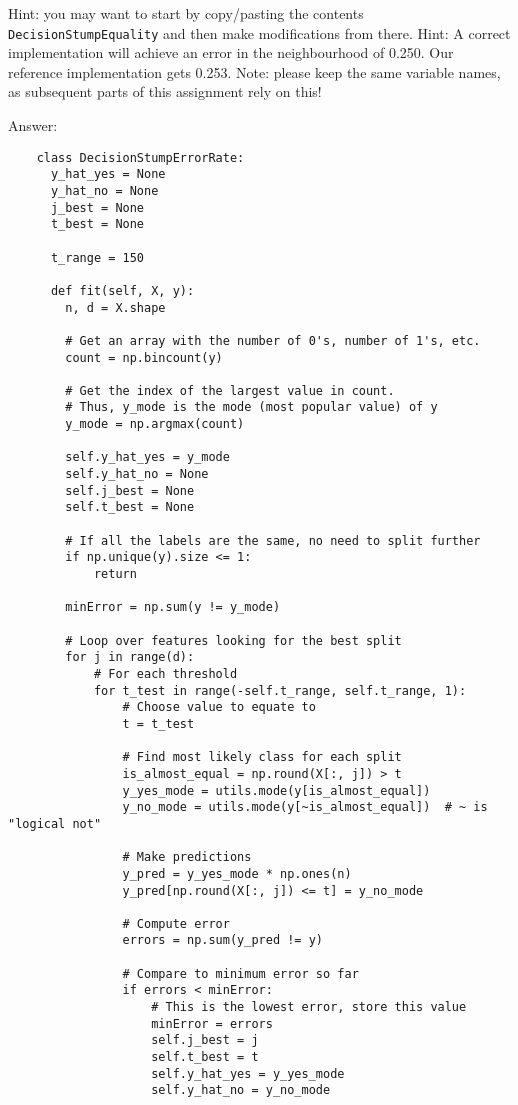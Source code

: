 \documentclass{article}
\newenvironment{answer}{\par\begingroup\color{gre}Answer: }{\endgroup}
\begin{document}
  Hint: you may want to start by copy/pasting the contents \texttt{DecisionStumpEquality} and then make modifications from there.
  Hint: A correct implementation will achieve an error in the neighbourhood of 0.250. Our reference implementation gets 0.253.
  Note: please keep the same variable names, as subsequent parts of this assignment rely on this!

  \begin{answer}
  \begin{verbatim}
    class DecisionStumpErrorRate:
      y_hat_yes = None
      y_hat_no = None
      j_best = None
      t_best = None

      t_range = 150

      def fit(self, X, y):
        n, d = X.shape

        # Get an array with the number of 0's, number of 1's, etc.
        count = np.bincount(y)

        # Get the index of the largest value in count.
        # Thus, y_mode is the mode (most popular value) of y
        y_mode = np.argmax(count)

        self.y_hat_yes = y_mode
        self.y_hat_no = None
        self.j_best = None
        self.t_best = None

        # If all the labels are the same, no need to split further
        if np.unique(y).size <= 1:
            return

        minError = np.sum(y != y_mode)

        # Loop over features looking for the best split
        for j in range(d):
            # For each threshold
            for t_test in range(-self.t_range, self.t_range, 1):
                # Choose value to equate to
                t = t_test

                # Find most likely class for each split
                is_almost_equal = np.round(X[:, j]) > t
                y_yes_mode = utils.mode(y[is_almost_equal])
                y_no_mode = utils.mode(y[~is_almost_equal])  # ~ is "logical not"

                # Make predictions
                y_pred = y_yes_mode * np.ones(n)
                y_pred[np.round(X[:, j]) <= t] = y_no_mode

                # Compute error
                errors = np.sum(y_pred != y)

                # Compare to minimum error so far
                if errors < minError:
                    # This is the lowest error, store this value
                    minError = errors
                    self.j_best = j
                    self.t_best = t
                    self.y_hat_yes = y_yes_mode
                    self.y_hat_no = y_no_mode


\end{verbatim}
\end{answer}
\end{document}

